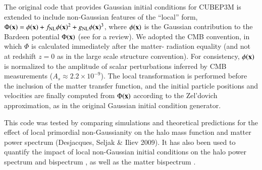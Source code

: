 
The original code that provides Gaussian initial conditions for {\small CUBEP3M} 
is extended to include non-Gaussian features of the ``local'' form,
$\Phi({\bf x})=\phi({\bf x})+f_{\rm NL} \phi({\bf x})^2 + g_{\rm NL} 
\phi({\bf x})^3$, where $\phi({\bf x})$ is the Gaussian contribution
to the Bardeen potential $\Phi({\bf x})$ (see \cite{F_NL} for a review). 
We adopted the CMB convention,
in which $\Phi$ is calculated immediately after the matter-
radiation equality (and not at redshift $z=0$ as in the large scale
structure convention). For consistency, $\phi({\bf x})$ is normalized
to the amplitude of scalar perturbations inferred by CMB measurements
($A_s\approx 2.2 \times 10^{-9}$). The local transformation is performed 
before the inclusion of the matter transfer function, and the initial 
particle positions and velocities are finally computed from $\Phi({\bf x})$ 
according to the Zel'dovich approximation, as in the original Gaussian initial condition generator.

This code was tested by comparing simulations and theoretical predictions
for the effect of local primordial non-Gaussianity on the halo mass 
function and matter power spectrum (Desjacques, Seljak \& Iliev 2009). 
It has also been used to quantify the impact of local non-Gaussian initial
conditions on the halo power spectrum \citep{2009MNRAS.396...85D,
2010PhRvD..81b3006D} and bispectrum \citep{2010MNRAS.406.1014S},
 as well as the matter bispectrum \citep{2011arXiv1111.6966S}.

